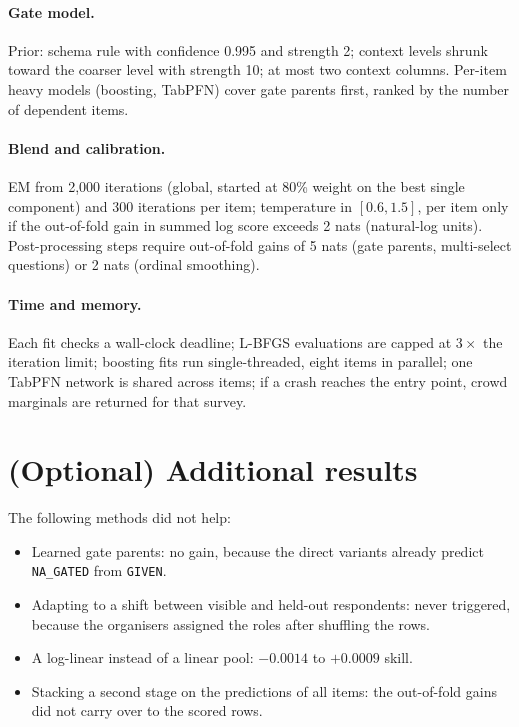 \documentclass{article}
\begin{document}
\paragraph{Gate model.} Prior: schema rule with confidence 0.995 and strength 2; context levels
shrunk toward the coarser level with strength 10; at most two context columns. Per-item heavy models
(boosting, TabPFN) cover gate parents first, ranked by the number of dependent items.

\paragraph{Blend and calibration.} EM from 2{,}000 iterations (global, started at 80\% weight on the
best single component) and 300 iterations per item; temperature in $[0.6, 1.5]$, per item only if
the out-of-fold gain in summed log score exceeds 2 nats (natural-log units). Post-processing steps require out-of-fold gains of 5 nats (gate
parents, multi-select questions) or 2 nats (ordinal smoothing).

\paragraph{Time and memory.} Each fit checks a wall-clock deadline; L-BFGS evaluations are capped
at $3\times$ the iteration limit; boosting fits run single-threaded, eight items in parallel; one
TabPFN network is shared across items; if a crash reaches the entry point, crowd marginals are
returned for that survey.

\section{(Optional) Additional results}

The following methods did not help:
\begin{itemize}[leftmargin=*]
  \item Learned gate parents: no gain, because the direct variants already predict
        \texttt{NA\_GATED} from \texttt{GIVEN}.
  \item Adapting to a shift between visible and held-out respondents: never triggered, because the
        organisers assigned the roles after shuffling the rows.
  \item A log-linear instead of a linear pool: $-0.0014$ to $+0.0009$ skill.
  \item Stacking a second stage on the predictions of all items: the out-of-fold gains did not
        carry over to the scored rows.
\end{itemize}
\end{document}

